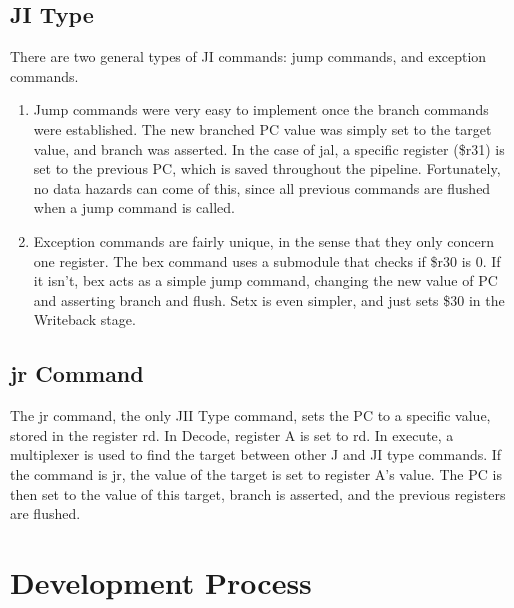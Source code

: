 \documentclass[letterpaper]{article} %
\begin{document}
\subsection*{JI Type}
There are two general types of JI commands: jump commands, and exception commands.
\begin{enumerate}
\item Jump commands were very easy to implement once the branch commands were established. The new branched PC value was simply set to the target value, and branch was asserted. In the case of jal, a specific register (\$r31) is set to the previous PC, which is saved throughout the pipeline. Fortunately, no data hazards can come of this, since all previous commands are flushed when a jump command is called.
\item Exception commands are fairly unique, in the sense that they only concern one register. The bex command uses a submodule that checks if \$r30 is 0. If it isn't, bex acts as a simple jump command, changing the new value of PC and asserting branch and flush. Setx is even simpler, and just sets \$30 in the Writeback stage.
\end{enumerate}

\subsection*{jr Command}
The jr command, the only JII Type command, sets the PC to a specific value, stored in the register rd. In Decode, register A is set to rd. In execute, a multiplexer is used to find the target between other J and JI type commands. If the command is jr, the value of the target is set to register A's value. The PC is then set to the value of this target, branch is asserted, and the previous registers are flushed.

\section*{Development Process}
\end{document}
